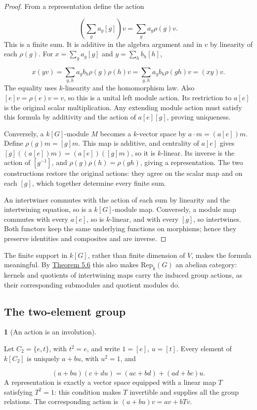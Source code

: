 \documentclass[11pt,a4paper]{article}
\newcommand{\mathheading}{}
\theoremstyle{plain}
\theoremstyle{definition}
\newtheorem*{definitionstatement}{\mathheading}
\newenvironment{mathdefinition}[3]{\renewcommand{\mathheading}{#1 #2}\begin{definitionstatement}[#3]}{\end{definitionstatement}}
\begin{document}
\begin{proof}

From a representation define the action

 \[\left(\sum_g a_g[g]\right)v=\sum_g a_g\rho(g)v.\] 
This is a finite sum. It is additive in the algebra argument and in \(v\) by linearity of each \(\rho(g)\). For \(x=\sum_g a_g[g]\) and \(y=\sum_h b_h[h]\),

 \[x(yv)=\sum_{g,h}a_gb_h\rho(g)\rho(h)v=\sum_{g,h}a_gb_h\rho(gh)v=(xy)v.\] 
The equality uses \(k\)-linearity and the homomorphism law. Also \([e]v=\rho(e)v=v\), so this is a unital left module action. Its restriction to \(a[e]\) is the original scalar multiplication. Any extending module action must satisfy this formula by additivity and the action of \(a[e][g]\), proving uniqueness.


Conversely, a \(k[G]\)-module \(M\) becomes a \(k\)-vector space by \(a\cdot m=(a[e])m\). Define \(\rho(g)m=[g]m\). This map is additive, and centrality of \(a[e]\) gives \([g]((a[e])m)=(a[e])([g]m)\), so it is \(k\)-linear. Its inverse is the action of \([g^{-1}]\), and \(\rho(g)\rho(h)=\rho(gh)\), giving a representation. The two constructions restore the original actions: they agree on the scalar map and on each \([g]\), which together determine every finite sum.


An intertwiner commutes with the action of each sum by linearity and the intertwining equation, so is a \(k[G]\)-module map. Conversely, a module map commutes with every \(a[e]\), so is \(k\)-linear, and with every \([g]\), so intertwines. Both functors keep the same underlying functions on morphisms; hence they preserve identities and composites and are inverse.


\end{proof}
 
The finite support in \(k[G]\), rather than finite dimension of \(V\), makes the formula meaningful. By \hyperref[env-5-6]{Theorem 5.6} this also makes \(\mathrm{Rep}_k(G)\) an abelian category: kernels and quotients of intertwining maps carry the induced group actions, as their corresponding submodules and quotient modules do.

 
\subsection{The two-element group}
\label{example}
 
\begin{mathdefinition}{Example}{7.5}{An action is an involution}
\label{env-7-5}

Let \(C_2=\{e,t\}\), with \(t^2=e\), and write \(1=[e]\), \(u=[t]\). Every element of \(k[C_2]\) is uniquely \(a+bu\), with \(u^2=1\), and

 \[(a+bu)(c+du)=(ac+bd)+(ad+bc)u.\] 
A representation is exactly a vector space equipped with a linear map \(T\) satisfying \(T^2=1\): this condition makes \(T\) invertible and supplies all the group relations. The corresponding action is \((a+bu)v=av+bTv\).


\end{mathdefinition}
 
\end{document}
